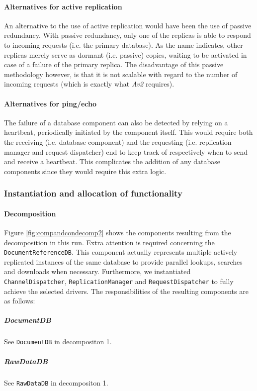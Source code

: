 \documentclass[a4paper,10pt]{article}
\begin{document}
\paragraph{Alternatives for active replication}
An alternative to the use of active replication would have been the use of passive redundancy. With passive redundancy, only one of the replicas is able to respond to incoming requests (i.e. the primary database). As the name indicates, other replicas merely serve as dormant (i.e. passive) copies, waiting to be activated in case of a failure of the primary replica. The disadvantage of this passive methodology however, is that it is not scalable with regard to the number of incoming requests (which is exactly what \emph{Av2} requires).

\paragraph{Alternatives for ping/echo}
The failure of a database component can also be detected by relying on a heartbeat, periodically initiated by the component itself. This would require both the receiving (i.e. database component) and the requesting (i.e. replication manager and request dispatcher) end to keep track of respectively when to send and receive a heartbeat. This complicates the addition of any database components since they would require this extra logic.

\subsubsection{Instantiation and allocation of functionality}
\paragraph{Decomposition}
Figure \ref{fig:compandcondecomp2} shows the components resulting from the decomposition in this run. Extra attention is required concerning the \texttt{DocumentReferenceDB}. This component actually represents multiple actively replicated instances of the same database to provide parallel lookups, searches and downloads when necessary. Furthermore, we instantiated \texttt{ChannelDispatcher}, \texttt{ReplicationManager} and \texttt{RequestDispatcher} to fully achieve the selected drivers.
The responsibilities of the resulting components are as follows:

\subparagraph{DocumentDB}
See \texttt{DocumentDB} in decompositon 1.

\subparagraph{RawDataDB}
See \texttt{RawDataDB} in decompositon 1.
\end{document}
